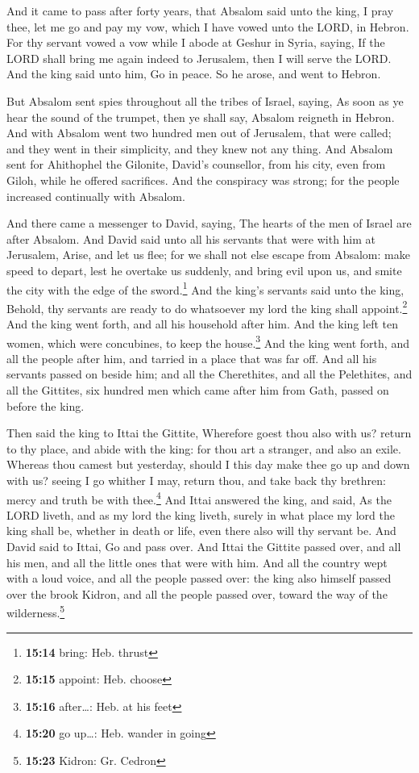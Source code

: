  And it came to pass after forty years, that Absalom said
unto the king, I pray thee, let me go and pay my vow, which I have vowed
unto the LORD, in Hebron.  For thy servant vowed a vow
while I abode at Geshur in Syria, saying, If the LORD shall bring me
again indeed to Jerusalem, then I will serve the LORD. 
And the king said unto him, Go in peace. So he arose, and went to
Hebron.

 But Absalom sent spies throughout all the tribes of
Israel, saying, As soon as ye hear the sound of the trumpet, then ye
shall say, Absalom reigneth in Hebron.  And with Absalom
went two hundred men out of Jerusalem, that were called; and they went
in their simplicity, and they knew not any thing.  And
Absalom sent for Ahithophel the Gilonite, David's counsellor, from his
city, even from Giloh, while he offered sacrifices. And the conspiracy
was strong; for the people increased continually with Absalom.

 And there came a messenger to David, saying, The hearts
of the men of Israel are after Absalom.  And David said
unto all his servants that were with him at Jerusalem, Arise, and let us
flee; for we shall not else escape from Absalom: make speed to depart,
lest he overtake us suddenly, and bring evil upon us, and smite the city
with the edge of the sword.\footnote{\textbf{15:14} bring: Heb. thrust}
 And the king's servants said unto the king, Behold, thy
servants are ready to do whatsoever my lord the king shall
appoint.\footnote{\textbf{15:15} appoint: Heb. choose} 
And the king went forth, and all his household after him. And the king
left ten women, which were concubines, to keep the house.\footnote{\textbf{15:16}
  after\ldots: Heb. at his feet}  And the king went
forth, and all the people after him, and tarried in a place that was far
off.  And all his servants passed on beside him; and all
the Cherethites, and all the Pelethites, and all the Gittites, six
hundred men which came after him from Gath, passed on before the king.

 Then said the king to Ittai the Gittite, Wherefore goest
thou also with us? return to thy place, and abide with the king: for
thou art a stranger, and also an exile.  Whereas thou
camest but yesterday, should I this day make thee go up and down with
us? seeing I go whither I may, return thou, and take back thy brethren:
mercy and truth be with thee.\footnote{\textbf{15:20} go up\ldots: Heb.
  wander in going}  And Ittai answered the king, and
said, As the LORD liveth, and as my lord the king liveth, surely in what
place my lord the king shall be, whether in death or life, even there
also will thy servant be.  And David said to Ittai, Go
and pass over. And Ittai the Gittite passed over, and all his men, and
all the little ones that were with him.  And all the
country wept with a loud voice, and all the people passed over: the king
also himself passed over the brook Kidron, and all the people passed
over, toward the way of the wilderness.\footnote{\textbf{15:23} Kidron:
  Gr. Cedron}


